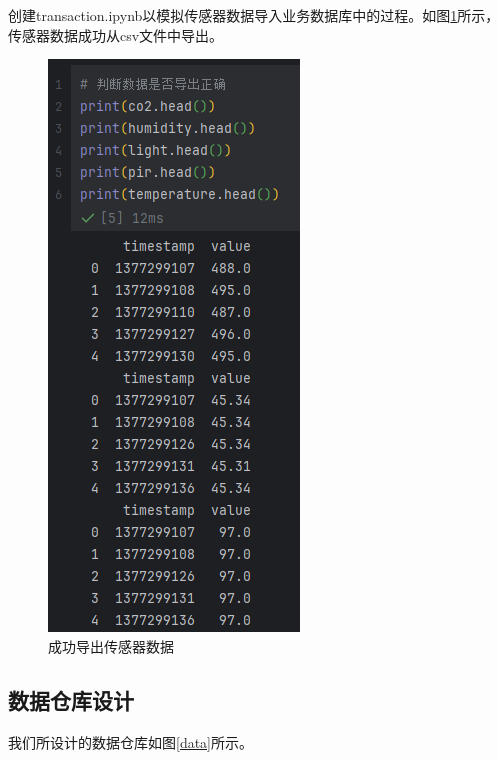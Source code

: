 创建transaction.ipynb以模拟传感器数据导入业务数据库中的过程。如图\ref{import}所示，传感器数据成功从csv文件中导出。

\begin{figure}[!htbp]
    \centering
    \includegraphics[scale=1]{images/import.png}
    \caption{成功导出传感器数据}\label{import}
\end{figure}


\subsection{数据仓库设计}
我们所设计的数据仓库如图\ref{data}所示。


